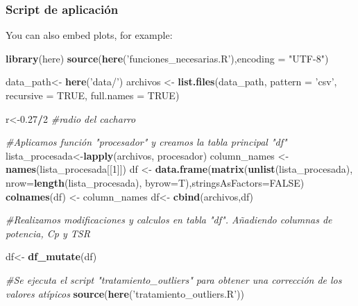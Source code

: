 \documentclass[]{article}
\newenvironment{Shaded}{\begin{snugshade}}{\end{snugshade}}
\newcommand{\KeywordTok}[1]{\textcolor[rgb]{0.13,0.29,0.53}{\textbf{#1}}}
\newcommand{\DataTypeTok}[1]{\textcolor[rgb]{0.13,0.29,0.53}{#1}}
\newcommand{\DecValTok}[1]{\textcolor[rgb]{0.00,0.00,0.81}{#1}}
\newcommand{\FloatTok}[1]{\textcolor[rgb]{0.00,0.00,0.81}{#1}}
\newcommand{\StringTok}[1]{\textcolor[rgb]{0.31,0.60,0.02}{#1}}
\newcommand{\CommentTok}[1]{\textcolor[rgb]{0.56,0.35,0.01}{\textit{#1}}}
\newcommand{\OtherTok}[1]{\textcolor[rgb]{0.56,0.35,0.01}{#1}}
\newcommand{\OperatorTok}[1]{\textcolor[rgb]{0.81,0.36,0.00}{\textbf{#1}}}
\newcommand{\NormalTok}[1]{#1}
\begin{document}
\subsubsection{Script de aplicación}\label{script-de-aplicacion}

You can also embed plots, for example:

\begin{Shaded}
\begin{Highlighting}[]
\KeywordTok{library}\NormalTok{(here)}
\KeywordTok{source}\NormalTok{(}\KeywordTok{here}\NormalTok{(}\StringTok{'funciones_necesarias.R'}\NormalTok{),}\DataTypeTok{encoding =} \StringTok{"UTF-8"}\NormalTok{)}

\NormalTok{data_path<-}\StringTok{ }\KeywordTok{here}\NormalTok{(}\StringTok{'data/'}\NormalTok{)}
\NormalTok{archivos <-}\StringTok{ }\KeywordTok{list.files}\NormalTok{(data_path, }\DataTypeTok{pattern =} \StringTok{'csv'}\NormalTok{,}
                       \DataTypeTok{recursive =} \OtherTok{TRUE}\NormalTok{, }\DataTypeTok{full.names =} \OtherTok{TRUE}\NormalTok{)}

\NormalTok{r<-}\FloatTok{0.27}\OperatorTok{/}\DecValTok{2} \CommentTok{#radio del cacharro}


\CommentTok{#Aplicamos función "procesador" y creamos la tabla principal "df"}
\NormalTok{lista_procesada<-}\KeywordTok{lapply}\NormalTok{(archivos, procesador)}
\NormalTok{column_names <-}\StringTok{ }\KeywordTok{names}\NormalTok{(lista_procesada[[}\DecValTok{1}\NormalTok{]])}
\NormalTok{df <-}\StringTok{ }\KeywordTok{data.frame}\NormalTok{(}\KeywordTok{matrix}\NormalTok{(}\KeywordTok{unlist}\NormalTok{(lista_procesada), }
                        \DataTypeTok{nrow=}\KeywordTok{length}\NormalTok{(lista_procesada), }
                        \DataTypeTok{byrow=}\NormalTok{T),}\DataTypeTok{stringsAsFactors=}\OtherTok{FALSE}\NormalTok{)}
\KeywordTok{colnames}\NormalTok{(df) <-}\StringTok{ }\NormalTok{column_names}
\NormalTok{df<-}\StringTok{ }\KeywordTok{cbind}\NormalTok{(archivos,df)}


\CommentTok{#Realizamos modificaciones y calculos en tabla "df". Añadiendo columnas de potencia, Cp y TSR}

\NormalTok{df<-}\StringTok{ }\KeywordTok{df_mutate}\NormalTok{(df)}



\CommentTok{#Se ejecuta el script "tratamiento_outliers" para obtener una corrección de los valores atípicos}
\KeywordTok{source}\NormalTok{(}\KeywordTok{here}\NormalTok{(}\StringTok{'tratamiento_outliers.R'}\NormalTok{))}


\end{Highlighting}
\end{Shaded}
\end{document}

